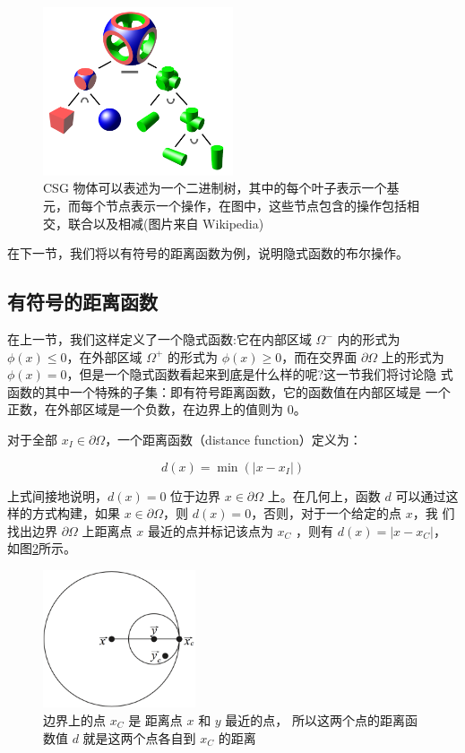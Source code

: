 \begin{figure}
	\sidecaption
	\includegraphics[width=0.5\textwidth]{figures/df/Csg-tree}
	\caption{CSG 物体可以表述为一个二进制树，其中的每个叶子表示一个基元，而每个节点表示一个操作，在图中，这些节点包含的操作包括相交，联合以及相减(图片来自 Wikipedia)}
	\label{f:df-csg-tree}
\end{figure}

在下一节，我们将以有符号的距离函数为例，说明隐式函数的布尔操作。



\subsection{有符号的距离函数}
在上一节，我们这样定义了一个隐式函数:它在内部区域 $\Omega^{−}$ 内的形式为 $\phi({x}) \leq 0$，在外部区域 $\Omega^{+}$ 的形式为 $\phi({x}) \geq 0$，而在交界面 $\partial\Omega$ 上的形式为 $\phi({x}) = 0$，但是一个隐式函数看起来到底是什么样的呢?这一节我们将讨论隐 式函数的其中一个特殊的子集：即有符号距离函数，它的函数值在内部区域是 一个正数，在外部区域是一个负数，在边界上的值则为 0。

对于全部 ${x}_I \in\partial\Omega$，一个距离函数（distance function）定义为：

\begin{equation}
	d({x})=\min (|{x}-{x}_I|)
\end{equation}

上式间接地说明，$d({x}) = 0$ 位于边界 ${x}\in\partial\Omega$ 上。在几何上，函数 $d$ 可以通过这样的方式构建，如果 ${x}\in \partial\Omega$，则 $d({x}) = 0$，否则，对于一个给定的点 ${x}$，我 们找出边界 $\partial\Omega$ 上距离点 ${x}$ 最近的点并标记该点为 ${x}_C$ ，则有 $d({x}) = |{x} − {x}_C |$， 如图\ref{f:df-distance-function}所示。

\begin{figure}
	\sidecaption
	\includegraphics[width=0.4\textwidth]{figures/df/distance-function}
	\caption{边界上的点 ${x}_C$ 是 距离点 ${x}$ 和 ${y}$ 最近的点， 所以这两个点的距离函数值 $d$ 就是这两个点各自到 ${x}_C$ 的距离}
	\label{f:df-distance-function}
\end{figure}

